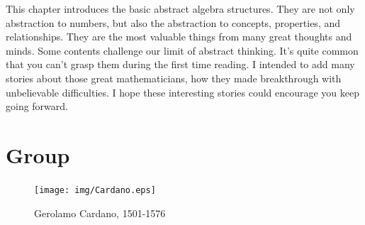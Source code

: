 \documentclass{article}
\begin{document}
This chapter introduces the basic abstract algebra structures. They are not only abstraction to numbers, but also the abstraction to concepts, properties, and relationships. They are the most valuable things from many great thoughts and minds. Some contents challenge our limit of abstract thinking. It's quite common that you can't grasp them during the first time reading. I intended to add many stories about those great mathematicians, how they made breakthrough with unbelievable difficulties. I hope these interesting stories could encourage you keep going forward.

\section{Group}

\begin{figure}[htbp]
 \centering
 \texttt{[image: img/Cardano.eps]}
 \captionsetup{labelformat=empty}
 \caption{Gerolamo Cardano, 1501-1576}
 \label{fig:Cardano}
\end{figure}

\end{document}
